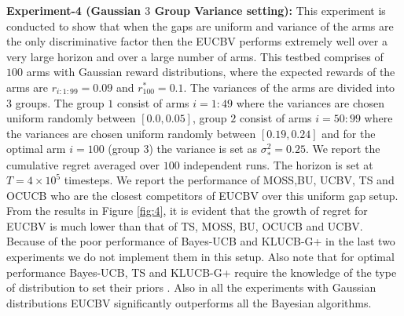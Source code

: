 \textbf{Experiment-4 (Gaussian $3$ Group Variance setting):} This experiment is conducted to show that when the gaps are uniform and variance of the arms are the only discriminative factor then the EUCBV performs extremely well over a very large horizon and over a large number of arms. This testbed comprises of $100$ arms with Gaussian reward distributions, where the expected rewards of the arms are $r_{i:1:99}=0.09$ and $r^{*}_{100}=0.1$. The variances of the arms are divided into $3$ groups. The group $1$ consist of arms $i=1:49$ where the variances are chosen uniform randomly between $[0.0,0.05]$, group $2$ consist of arms $i=50:99$ where the variances are chosen uniform randomly between $[0.19,0.24]$ and for the optimal arm $i=100$ (group $3$) the variance is set as $\sigma_{*}^{2}=0.25$. We report the cumulative regret averaged over $100$ independent runs. The horizon is set at $T=4\times 10^{5}$ timesteps. We report the performance of MOSS,BU, UCBV, TS and OCUCB who are the closest competitors of EUCBV over this uniform gap setup. From the results in Figure \ref{fig:4}, it is evident that the growth of regret for EUCBV  is much lower than that of TS, MOSS, BU, OCUCB and UCBV. Because of the poor performance of Bayes-UCB and KLUCB-G+ in the last two experiments we do not implement them in this setup. Also note that for optimal performance Bayes-UCB, TS and KLUCB-G+ require the knowledge of the type of distribution to set their priors . Also in all the experiments with Gaussian distributions EUCBV significantly outperforms all the Bayesian algorithms.


